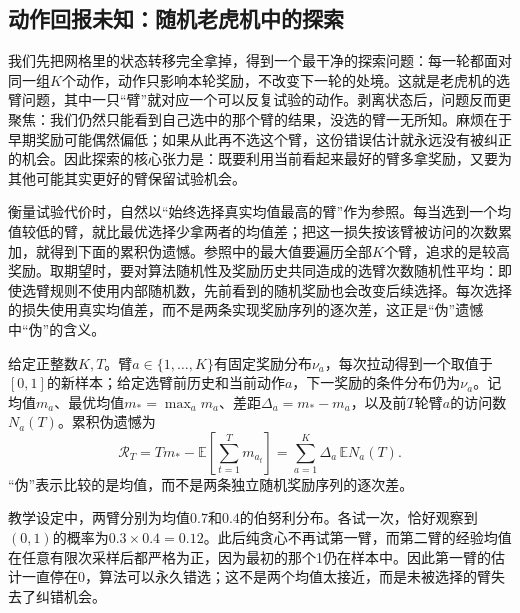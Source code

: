 \subsection{动作回报未知：随机老虎机中的探索}
\label{sec:rl-learning-bandits}

我们先把网格里的状态转移完全拿掉，得到一个最干净的探索问题：每一轮都面对同一组$K$个动作，动作只影响本轮奖励，不改变下一轮的处境。这就是老虎机的选臂问题，其中一只“臂”就对应一个可以反复试验的动作。剥离状态后，问题反而更聚焦：我们仍然只能看到自己选中的那个臂的结果，没选的臂一无所知。麻烦在于早期奖励可能偶然偏低；如果从此再不选这个臂，这份错误估计就永远没有被纠正的机会。因此探索的核心张力是：既要利用当前看起来最好的臂多拿奖励，又要为其他可能其实更好的臂保留试验机会。

衡量试验代价时，自然以“始终选择真实均值最高的臂”作为参照。每当选到一个均值较低的臂，就比最优选择少拿两者的均值差；把这一损失按该臂被访问的次数累加，就得到下面的累积伪遗憾。参照中的最大值要遍历全部$K$个臂，追求的是较高奖励。取期望时，要对算法随机性及奖励历史共同造成的选臂次数随机性平均：即使选臂规则不使用内部随机数，先前看到的随机奖励也会改变后续选择。每次选择的损失使用真实均值差，而不是两条实现奖励序列的逐次差，这正是“伪”遗憾中“伪”的含义。

\begin{definition}[有界随机老虎机]
  \label{def:rl-learning-stochastic-bandit}
  给定正整数$K,T$。臂$a\in\{1,\ldots,K\}$有固定奖励分布$\nu_a$，每次拉动得到一个取值于$[0,1]$的新样本；给定选臂前历史和当前动作$a$，下一奖励的条件分布仍为$\nu_a$。记均值$m_a$、最优均值$m_*=\max_a m_a$、差距$\Delta_a=m_*-m_a$，以及前$T$轮臂$a$的访问数$N_a(T)$。累积伪遗憾为
  \begin{equation}
    \mathcal R_T
    =T m_*-\mathbb E\!\left[\sum_{t=1}^T m_{a_t}\right]
    =\sum_{a=1}^K\Delta_a\,\mathbb E N_a(T).
    \label{eq:rl-learning-bandit-regret}
  \end{equation}
  “伪”表示比较的是均值，而不是两条独立随机奖励序列的逐次差。
\end{definition}

\begin{example}[一次噪声如何锁住贪心策略]
  \label{ex:rl-learning-greedy-trap}
  教学设定中，两臂分别为均值$0.7$和$0.4$的伯努利分布。各试一次，恰好观察到$(0,1)$的概率为$0.3\times0.4=0.12$。此后纯贪心不再试第一臂，而第二臂的经验均值在任意有限次采样后都严格为正，因为最初的那个1仍在样本中。因此第一臂的估计一直停在0，算法可以永久错选；这不是两个均值太接近，而是未被选择的臂失去了纠错机会。
\end{example}

